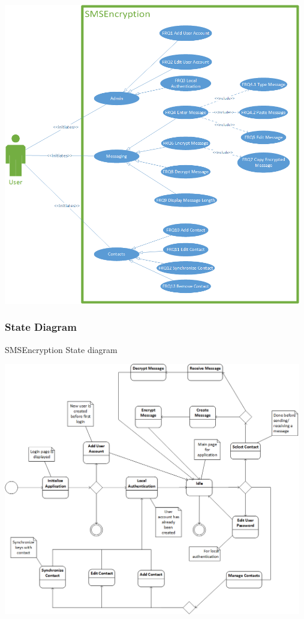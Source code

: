 \begin{center}
 \includegraphics[width=13cm]{diagrams/UseCaseDiagrams/UsecaseV5.png}
\end{center}

\subsubsection{State Diagram}
SMSEncryption State diagram

\begin{center}
 \includegraphics[width=13cm]{diagrams/StateDiagrams/SMSEncryptionStateMachine.png}
\end{center}


